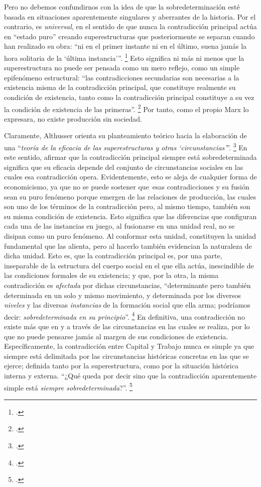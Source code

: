 Pero no debemos confundirnos con la idea de que la sobredeterminación esté basada en situaciones aparentemente singulares y aberrantes de la historia. Por el contrario, es \emph{universal}, en el sentido de que nunca la contradicción principal actúa en \enquote{estado puro} creando superestructuras que posteriormente se separan cuando han realizado su obra: \enquote{ni en el primer instante ni en el último, suena jamás la hora solitaria de la \enquote{última instancia}}. \footcite[][93]{@7051-ALTHUSSER1965} Esto significa ni más ni menos que la superestructura no puede ser pensada como un mero reflejo, como un simple epifenómeno estructural: \enquote{las contradicciones secundarias son necesarias a la existencia misma de la contradicción principal, que constituye realmente su condición de existencia, tanto como la contradicción principal constituye a su vez la condición de existencia de las primeras}. \footcite[][170]{@7051-ALTHUSSER1965} Por tanto, como el propio Marx lo expresara, no existe producción sin sociedad.

Claramente, Althusser orienta su planteamiento teórico hacia la elaboración de una \enquote{\emph{teoría de la eficacia de las superestructuras y otras \enquote{circunstancias}}}. \footcite[][93]{@7051-ALTHUSSER1965} En este sentido, afirmar que la contradicción principal siempre está sobredeterminada significa que su eficacia depende del conjunto de circunstancias sociales en las cuales esa contradicción opera. Evidentemente, esto se aleja de cualquier forma de economicismo, ya que no se puede sostener que~esas contradicciones y su fusión sean su puro fenómeno porque emergen de las relaciones de producción, las cuales son uno de los términos de la contradicción pero, al mismo tiempo, también son su misma condición de existencia. Esto significa que las diferencias que configuran cada una de las instancias en juego, al fusionarse en una unidad real, no se disipan como un puro fenómeno. Al conformar esta unidad\emph, constituyen la unidad fundamental que las alienta, pero al hacerlo también evidencian la naturaleza de dicha unidad. Esto es, que la contradicción principal es, por una parte, inseparable de la estructura del cuerpo social en el que ella actúa, inescindible de las condiciones formales de su existencia; y que, por la otra, la misma contradicción es \emph{afectada} por dichas circunstancias, \enquote{determinante pero también determinada en un solo y mismo movimiento, y determinada por los diversos \emph{niveles} y las diversas \emph{instancias} de la formación social que ella arma; podríamos decir: \emph{sobredeterminada en su principio}}. \footcite[][81]{@7051-ALTHUSSER1965} En definitiva, una contradicción no existe más que en y a través de las circunstancias en las cuales se realiza, por lo que no puede pensarse jamás al margen de sus condiciones de existencia. Específicamente, la contradicción entre Capital y Trabajo nunca es simple ya que siempre está delimitada por las circunstancias históricas concretas en las que se ejerce; definida tanto por la superestructura, como por la situación histórica interna y externa. \enquote{¿Qué queda por decir sino que la contradicción aparentemente simple está \emph{siempre sobredeterminada}?}. \footcite[][86]{@7051-ALTHUSSER1965}

